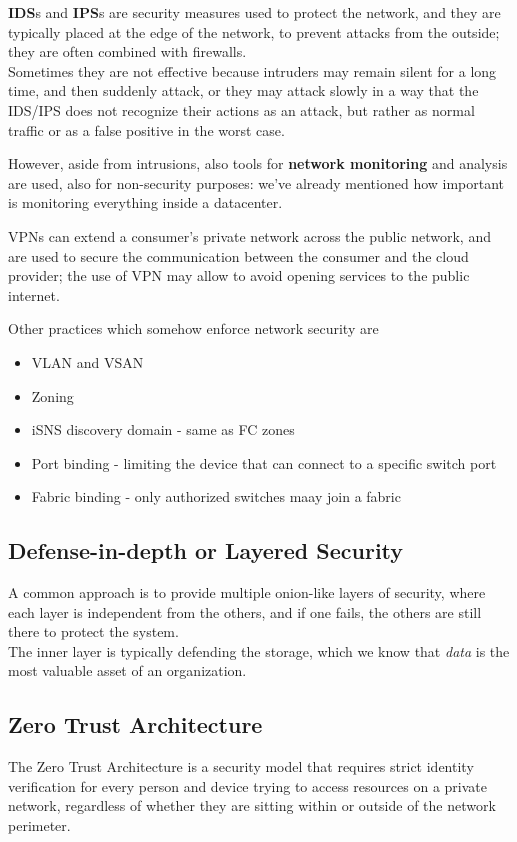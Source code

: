 \textbf{IDS}s and \textbf{IPS}s are security measures used to protect the network, and they are typically placed at the edge of the network, to prevent attacks from the outside;
they are often combined with firewalls.\\
Sometimes they are not effective because intruders may remain silent for a long time, and then suddenly attack, or they may attack slowly in a way that the IDS/IPS does not recognize their actions as an attack, but rather as normal traffic or as a false positive in the worst case.

However, aside from intrusions, also tools for \textbf{network monitoring} and analysis are used, also for non-security purposes: we've already mentioned how important is monitoring everything inside a datacenter.

VPNs can extend a consumer's private network across the public network, and are used to secure the communication between the consumer and the cloud provider; the use of VPN may allow to avoid opening services to the public internet.

Other practices which somehow enforce network security are\ns
\begin{itemize}
   \item VLAN and VSAN
   \item Zoning
   \item iSNS discovery domain - same as FC zones
   \item Port binding - limiting the device that can connect to a specific switch port
   \item Fabric binding - only authorized switches maay join a fabric
\end{itemize}
\subsection{Defense-in-depth or Layered Security}
A common approach is to provide multiple onion-like layers of security, where each layer is independent from the others, and if one fails, the others are still there to protect the system.\\
The inner layer is typically defending the storage, which we know that \textit{data} is the most valuable asset of an organization.

\subsection{Zero Trust Architecture}
The Zero Trust Architecture is a security model that requires strict identity verification for every person and device trying to access resources on a private network, regardless of whether they are sitting within or outside of the network perimeter.

